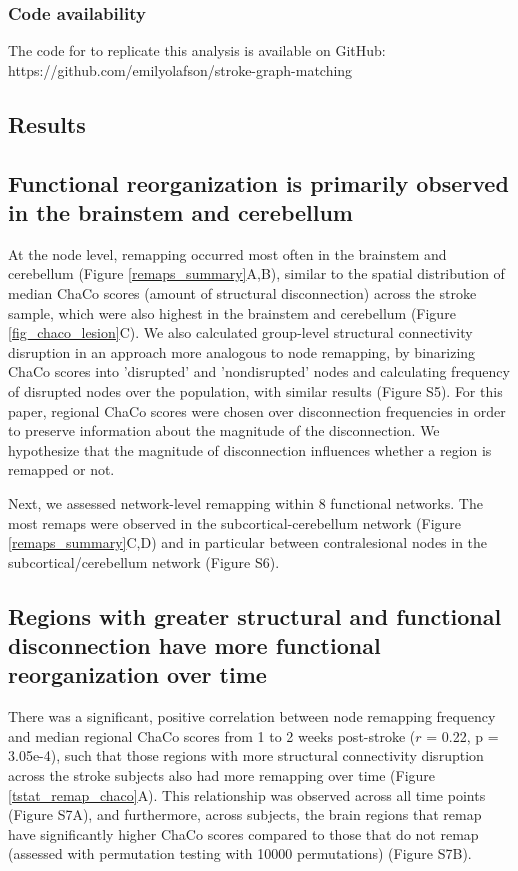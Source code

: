 \documentclass[phd,tocprelim]{cornell}
\begin{document}
	\subsubsection{Code availability}
	 The code for to replicate this analysis is available on GitHub: https://github.com/emilyolafson/stroke-graph-matching
	
	
\subsection*{Results}
	\subsection{Functional reorganization is primarily observed in the brainstem and cerebellum}
	At the node level, remapping occurred most often in the brainstem and cerebellum (Figure \ref{remaps_summary}A,B), similar to the spatial distribution of median ChaCo scores (amount of structural disconnection) across the stroke sample, which were also highest in the brainstem and cerebellum (Figure \ref{fig_chaco_lesion}C). We also calculated group-level structural connectivity disruption in an approach more analogous to node remapping, by binarizing ChaCo scores into 'disrupted' and 'nondisrupted' nodes and calculating frequency of disrupted nodes over the population, with similar results (Figure S5). For this paper, regional ChaCo scores were chosen over disconnection frequencies in order to preserve information about the magnitude of the disconnection. We hypothesize that the magnitude of disconnection influences whether a region is remapped or not.
	
	Next, we assessed network-level remapping within 8 functional networks. The most remaps were observed in the subcortical-cerebellum network (Figure \ref{remaps_summary}C,D) and in particular between contralesional nodes in the subcortical/cerebellum network (Figure S6).
	
	\subsection{Regions with greater structural and functional disconnection  have more functional reorganization over time}
	There was a significant, positive correlation between node remapping frequency and median regional ChaCo scores from 1 to 2 weeks post-stroke ($r$ = 0.22, p = 3.05e-4), such that those regions with more structural connectivity disruption across the stroke subjects also had more remapping over time (Figure \ref{tstat_remap_chaco}A). This relationship was observed across all time points (Figure S7A), and furthermore, across subjects, the brain regions that remap have significantly higher ChaCo scores compared to those that do not remap (assessed with permutation testing with 10000 permutations) (Figure S7B).
	
\end{document}
